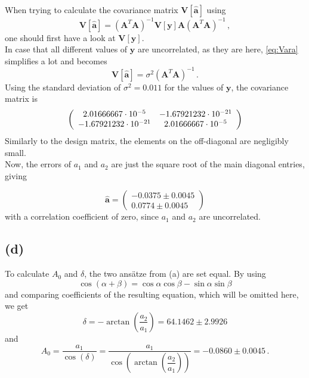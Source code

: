 When trying to calculate the covariance matrix $\textbf{V}[\hat{\textbf{a}}]$ using
\begin{equation}
    \textbf{V}[\hat{\textbf{a}}] = (\textbf{A}^T\textbf{A})^{-1}\textbf{V}[\textbf{y}] \textbf{A} (\textbf{A}^T\textbf{A})^{-1} \,,
    \label{eq:Vara}
\end{equation}
one should first have a look at $\textbf{V}[\textbf{y}]$. \\
In case that all different values of $\textbf{y}$ are uncorrelated, as they are here, \eqref{eq:Vara} simplifies a lot and becomes
\begin{equation*}
    \textbf{V}[\hat{\textbf{a}}] = \sigma^2 (\textbf{A}^T \textbf{A})^{-1} \,.
\end{equation*}
Using the standard deviation of $\sigma^2 = 0.011$ for the values of $\textbf{y}$, the covariance matrix is
\begin{equation*}
    \left(
        \begin{array}{c c}
        2.01666667 \cdot 10^{-5}  & -1.67921232 \cdot 10^{-21} \\
        -1.67921232 \cdot 10^{-21} &  2.01666667 \cdot 10^{-5} \\
        \end{array}
    \right)
\end{equation*}
Similarly to the design matrix, the elements on the off-diagonal are negligibly small. \\
Now, the errors of $a_1$ and $a_2$ are just the square root of the main diagonal entries, giving

\begin{equation*}
    \hat{\textbf{a}}
    = \left(\begin{array}{c}
        -0.0375 \pm 0.0045 \\
         0.0774 \pm 0.0045
    \end{array} \right)
\end{equation*}
with a correlation coefficient of zero, since $a_1$ and $a_2$ are uncorrelated.

\subsection*{(d)}

To calculate $A_0$ and $\delta$, the two ansätze from (a) are set equal.
By using
\begin{equation*}
    \cos(\alpha + \beta) = \cos\alpha \cos\beta - \sin\alpha \sin\beta
\end{equation*}
and comparing coefficients of the resulting equation, which will be omitted here, we get
\begin{equation*}
    \delta = -\arctan\left(\dfrac{a_2}{a_1}\right) = 64.1462 \pm 2.9926
\end{equation*}
and
\begin{equation*}
    A_0 = \dfrac{a_1}{\cos(\delta)} =\dfrac{a_1}{\cos \left(\arctan \left(\dfrac{a_2}{a_1}\right)\right)} = -0.0860 \pm 0.0045 \,.
\end{equation*}

